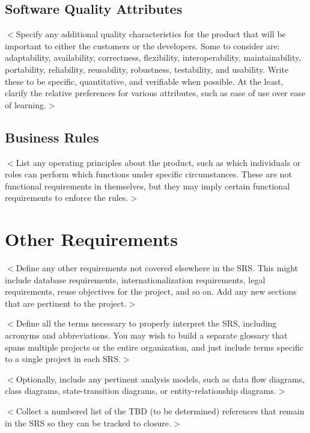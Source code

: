 \documentclass[a4paper, 11pt]{scrreprt}
\begin{document}
\section{Software Quality Attributes}
$<$Specify any additional quality characteristics for the product that will be 
important to either the customers or the developers. Some to consider are: 
adaptability, availability, correctness, flexibility, interoperability, 
maintainability, portability, reliability, reusability, robustness, testability, 
and usability. Write these to be specific, quantitative, and verifiable when 
possible. At the least, clarify the relative preferences for various attributes, 
such as ease of use over ease of learning.$>$

\section{Business Rules}
$<$List any operating principles about the product, such as which individuals or 
roles can perform which functions under specific circumstances. These are not 
functional requirements in themselves, but they may imply certain functional 
requirements to enforce the rules.$>$


\chapter{Other Requirements}
$<$Define any other requirements not covered elsewhere in the SRS. This might 
include database requirements, internationalization requirements, legal 
requirements, reuse objectives for the project, and so on. Add any new sections 
that are pertinent to the project.$>$

$<$Define all the terms necessary to properly interpret the SRS, including 
acronyms and abbreviations. You may wish to build a separate glossary that spans 
multiple projects or the entire organization, and just include terms specific to 
a single project in each SRS.$>$

$<$Optionally, include any pertinent analysis models, such as data flow 
diagrams, class diagrams, state-transition diagrams, or entity-relationship 
diagrams.$>$

$<$Collect a numbered list of the TBD (to be determined) references that remain 
in the SRS so they can be tracked to closure.$>$
\end{document}
